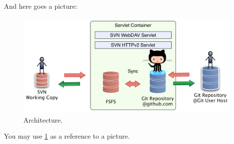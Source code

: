 \documentclass[aps,%
12pt,%
final,%
oneside,
onecolumn,%
superscriptaddress,%
centertags]{article} %
\begin{document}
And here goes a picture:

\begin{figure}[!h]
\label{arch}
\centering
\includegraphics[width=\linewidth]{img/servlet/components_not_that_safe.pdf}
\caption{Architecture.}
\end{figure}

You may use \ref{arch} as a reference to a picture.
\end{document}
